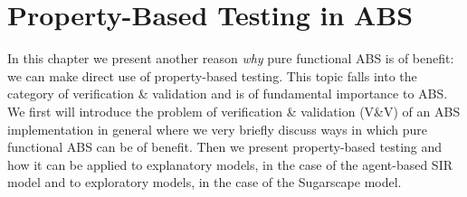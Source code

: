 \chapter{Property-Based Testing in ABS}
\label{ch:property}

In this chapter we present another reason \textit{why} pure functional ABS is of benefit: we can make direct use of property-based testing. This topic falls into the category of verification \& validation and is of fundamental importance to ABS. We first will introduce the problem of verification \& validation (V\&V) of an ABS implementation in general where we very briefly discuss ways in which pure functional ABS can be of benefit. Then we present property-based testing and how it can be applied to explanatory models, in the case of the agent-based SIR model and to exploratory models, in the case of the Sugarscape model.









